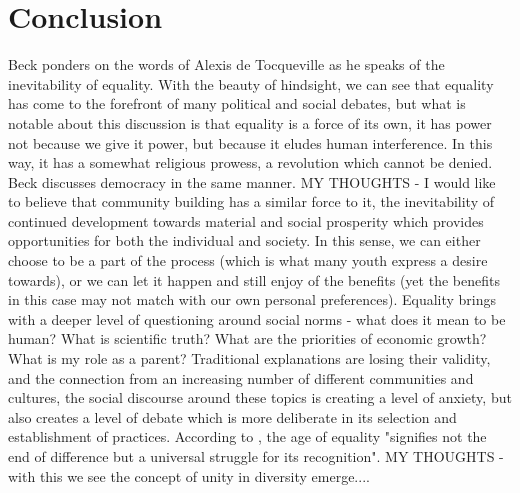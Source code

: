 \chapter{Conclusion}
Beck ponders on the words of Alexis de Tocqueville as he speaks of the inevitability of equality. With the beauty of hindsight, we can see that equality has come to the forefront of many political and social debates, but what is notable about this discussion is that equality is a force of its own, it has power not because we give it power, but because it eludes human interference. In this way, it has a somewhat religious prowess, a revolution which cannot be denied. Beck discusses democracy in the same manner. \citep{Beck2001} MY THOUGHTS - I would like to believe that community building has a similar force to it, the inevitability of continued development towards material and social prosperity which provides opportunities for both the individual and society. In this sense, we can either choose to be a part of the process (which is what many youth express a desire towards), or we can let it happen and still enjoy of the benefits (yet the benefits in this case may not match with our own personal preferences). Equality brings with a deeper level of questioning around social norms - what does it mean to be human? What is scientific truth? What are the priorities of economic growth? What is my role as a parent? Traditional explanations are losing their validity, and the connection from an increasing number of different communities and cultures, the social discourse around these topics is creating a level of anxiety, but also creates a level of debate which is more deliberate in its selection and establishment of practices. According to \citet[][p174]{Beck2001}, the age of equality "signifies not the end of difference but a universal struggle for its recognition". MY THOUGHTS - with this we see the concept of unity in diversity emerge.... 




